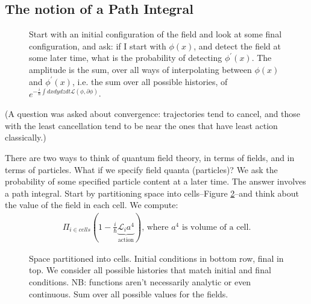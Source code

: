 \documentclass[]{article}
\begin{document}
\subsection{The notion of a Path Integral}
\begin{figure}[H]
	\begin{center}
		\caption[The notion of a Path Integral]{Start with an initial configuration of the field and look at some final configuration, and ask: if I start with $\phi(x)$, and detect the field at some later time, what is the probability of detecting $\phi^\prime(x)$. The amplitude is the sum, over all ways of interpolating between $\phi(x)$ and $\phi^\prime(x)$, i.e. the sum over all possible histories, of $e^{-\frac{i}{\hslash} \int dx dy dz dt\mathcal{L}(\phi,\partial \phi) }$. }\label{fig:path-integral1}
	\end{center}
\end{figure}

(A question was asked about convergence: trajectories tend to cancel, and those with the least cancellation tend to be near the ones that have least action classically.)

There are two ways to think of quantum field theory, in terms of fields, and in terms of particles. What if we specify field quanta (particles)? We ask the probability of some specified particle content at a later time. The answer involves a path integral. Start by partitioning space into cells--Figure \ref{fig:path-integral2}--and think about the value of the field in each cell. We compute:
\begin{align*}
	\Pi_{i\in cells}(1-\frac{i}{\hslash} \underbrace{\mathcal{L}_i a^4}_\text{action}) \text{, where $a^4$ is volume of a cell.}
\end{align*}
 
\begin{figure}[H]
	\begin{center}
		\caption[Space partitioned into cells]{Space partitioned into cells. Initial conditions in bottom row, final in top. We consider all possible histories that match initial and final conditions. NB: functions aren't necessarily analytic or even continuous. Sum over all possible values for the fields.}\label{fig:path-integral2}
	\end{center}
\end{figure}
\end{document}
